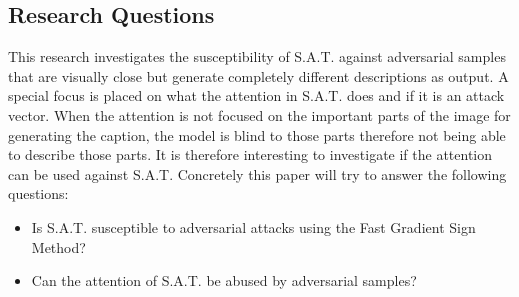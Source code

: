 \subsection{Research Questions}
This research investigates the susceptibility of S.A.T. against adversarial samples that are visually close but generate completely different descriptions as output. A special focus is placed on what the attention in S.A.T. does and if it is an attack vector. When the attention is not focused on the important parts of the image for generating the caption, the model is blind to those parts therefore not being able to describe those parts. It is therefore interesting to investigate if the attention can be used against S.A.T.
Concretely this paper will try to answer the following questions:
\begin{itemize}
    \item Is S.A.T. susceptible to adversarial attacks using the Fast Gradient Sign Method?
    \item Can the attention of S.A.T. be abused by adversarial samples?
\end{itemize}
